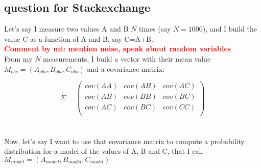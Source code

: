 \documentclass[11pt]{scrartcl}
\newcommand{\com}[2]{\xspace\textcolor{red}{\textbf{Comment by #1: #2}}}
\begin{document}
\subsection{question for Stackexchange}

Let's say I measure two values A and B $N$ times
(say $N=1000$), and I build the value C as a function of A and B, 
say C=A+B.\\ \com{mt}{mention noise, speak about random variables}
\\
From my $N$ measurements, I build a vector 
with their mean value $M_{obs}=(A_{obs}, B_{obs}, C_{obs})$ and a 
covariance matrix:

\begin{equation*}
\Sigma=
  \begin{pmatrix}
    cov(AA) & cov(AB) & cov(AC) \\
    cov(AB) & cov(BB) & cov(BC) \\
    cov(AC) & cov(BC) & cov(CC) \\      
  \end{pmatrix}
\end{equation*}
\\
\\
Now, let's say I want to use that covariance matrix to compute a 
probability distribution for a model of the values of A, B and C, that 
I call $M_{model} = (A_{model}, B_{model}, C_{model})$
\end{document}
